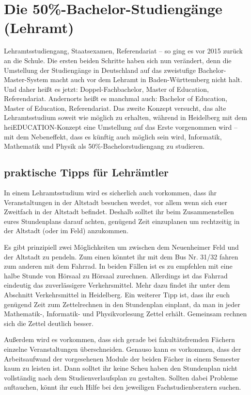 \section{Die 50\%-Bachelor-Studiengänge (Lehramt)} %
\label{lehramt_allg}

Lehramtsstudiengang, Staatsexamen, Referendariat -- so ging es vor 2015 zurück an die Schule. Die ersten beiden Schritte haben sich nun verändert, denn die Umstellung der Studiengänge in Deutschland auf das zweistufige Bachelor-Master-System macht auch vor dem Lehramt in Baden-Württemberg nicht halt. Und daher heißt es jetzt: Doppel-Fachbachelor, Master of Education, Referendariat. Andernorts heißt es manchmal auch: Bachelor of Education, Master of Education, Referendariat. Das zweite Konzept versucht, das alte Lehramtsstudium soweit wie möglich zu erhalten, während in Heidelberg mit dem heiEDUCATION-Konzept eine Umstellung auf das Erste vorgenommen wird -- mit dem Nebeneffekt, dass es künftig auch möglich sein wird, Informatik, Mathematik und Physik als 50\%-Bachelorstudiengang zu studieren.

\subsection{praktische Tipps für Lehrämtler}
In einem Lehramtsstudium wird es sicherlich auch vorkommen, dass ihr Veranstaltungen in der Altstadt besuchen werdet, vor allem wenn sich euer Zweitfach in der Altstadt befindet. Deshalb solltet ihr beim Zusammenstellen eures Stundenplans darauf achten, genügend Zeit einzuplanen um rechtzeitig in der Altstadt (oder im Feld) anzukommen.

Es gibt prinzipiell zwei Möglichkeiten um zwischen dem Neuenheimer Feld und der Altstadt zu pendeln. Zum einen könntet ihr mit dem Bus Nr. 31/32  fahren zum anderen mit dem Fahrrad. In beiden Fällen ist es zu empfehlen mit eine halbe Stunde von Hörsaal zu Hörsaal zurechnen. Allerdings ist das Fahrrad eindeutig das zuverlässigere Verkehrsmittel. Mehr dazu findet ihr unter dem Abschnitt Verkehrsmittel in Heidelberg. 
Ein weiterer Tipp ist, dass ihr euch genügend Zeit zum Zettelrechnen in den Stundenplan einplant, da man in jeder Mathematik-, Informatik- und Physikvorlesung Zettel erhält. Gemeinsam rechnen sich die Zettel deutlich besser. 

Außerdem wird es vorkommen, dass sich gerade bei fakultätsfremden Fächern einzelne Veranstaltungen überschneiden. Genauso kann es vorkommen, dass der Arbeitsaufwand der vorgesehenen Module der beiden Fächer in einem Semester kaum zu leisten ist. Dann solltet ihr keine Scheu haben den Stundenplan nicht vollständig nach dem Studienverlaufsplan zu gestalten. Sollten dabei Probleme auftauchen, könnt ihr euch Hilfe bei den jeweiligen Fachstudienberatern suchen.


